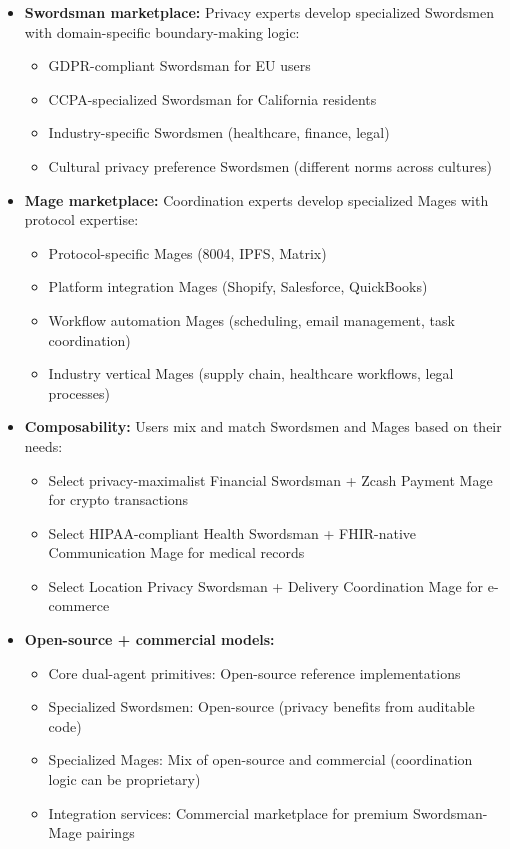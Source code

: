 \documentclass[11pt,a4paper]{article}
\theoremstyle{definition}
\begin{document}
\begin{itemize}
    \item \textbf{Swordsman marketplace:} Privacy experts develop specialized Swordsmen with domain-specific boundary-making logic:
    \begin{itemize}
        \item GDPR-compliant Swordsman for EU users
        \item CCPA-specialized Swordsman for California residents
        \item Industry-specific Swordsmen (healthcare, finance, legal)
        \item Cultural privacy preference Swordsmen (different norms across cultures)
    \end{itemize}
    
    \item \textbf{Mage marketplace:} Coordination experts develop specialized Mages with protocol expertise:
    \begin{itemize}
        \item Protocol-specific Mages (8004, IPFS, Matrix)
        \item Platform integration Mages (Shopify, Salesforce, QuickBooks)
        \item Workflow automation Mages (scheduling, email management, task coordination)
        \item Industry vertical Mages (supply chain, healthcare workflows, legal processes)
    \end{itemize}
    
    \item \textbf{Composability:} Users mix and match Swordsmen and Mages based on their needs:
    \begin{itemize}
        \item Select privacy-maximalist Financial Swordsman + Zcash Payment Mage for crypto transactions
        \item Select HIPAA-compliant Health Swordsman + FHIR-native Communication Mage for medical records
        \item Select Location Privacy Swordsman + Delivery Coordination Mage for e-commerce
    \end{itemize}
    
    \item \textbf{Open-source + commercial models:}
    \begin{itemize}
        \item Core dual-agent primitives: Open-source reference implementations
        \item Specialized Swordsmen: Open-source (privacy benefits from auditable code)
        \item Specialized Mages: Mix of open-source and commercial (coordination logic can be proprietary)
        \item Integration services: Commercial marketplace for premium Swordsman-Mage pairings
    \end{itemize}
    

\end{itemize}
\end{document}
